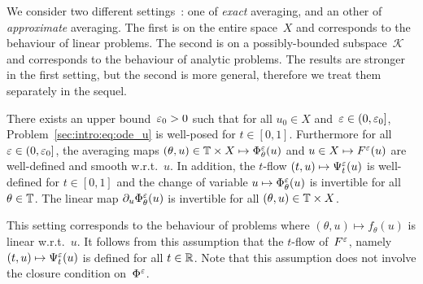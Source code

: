 We consider two different settings~: one of \textit{exact} averaging,
and an other of \textit{approximate} averaging. The first is on the
entire space~$X$ and corresponds to the behaviour of linear problems.
The second is on a possibly-bounded subspace~$\mathcal{K}$ and
corresponds to the behaviour of analytic problems. The results are
stronger in the first setting, but the second is more general, therefore
we treat them separately in the sequel.

\begin{assumption} \label{hyp:exist_avg_lin}
  There exists an upper bound~$\varepsilon_0 > 0$ such that for all $u_0 \in X$
  and~$\varepsilon \in (0, \varepsilon_0]$, Problem~\eqref{sec:intro:eq:ode_u} is
  well-posed for $t \in [0,1]$. Furthermore for all $\varepsilon \in (0,
  \varepsilon_0]$, the averaging maps $(\theta, u) \in \mathbb{T} \times X \mapsto
  \Phi^\varepsilon_\theta(u)$ and $u \in X \mapsto F^\varepsilon (u)$ are well-defined
  and smooth w.r.t.~$u$. In addition, the $t$-flow $(t,u) \mapsto
  \Psi^\varepsilon_t(u)$ is well-defined for $t \in [0,1]$ and the change of
  variable $u \mapsto \Phi^\varepsilon _\theta(u)$ is invertible for all
  $\theta \in \mathbb{T}$. The linear map $\partial_u \Phi^\varepsilon _\theta(u)$ is
  invertible for all $(\theta,u) \in \mathbb{T} \times X$.
\end{assumption}
This setting corresponds to the behaviour of problems where $(\theta, u)
\mapsto f_\theta(u)$ is linear w.r.t.~$u$. It follows from this
assumption that the $t$-flow of~$F^\varepsilon$, namely~$(t,u) \mapsto
\Psi^\varepsilon _t(u)$ is defined for all $t \in \mathbb{R}$. Note that this
assumption does not involve the closure condition on~$\Phi^\varepsilon$.


